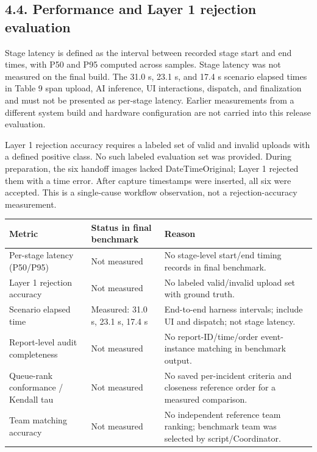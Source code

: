 \documentclass[pdflatex,sn-mathphys-ay]{sn-jnl}
\begin{document}

\subsection*{4.4. Performance and Layer 1 rejection evaluation}

Stage latency is defined as the interval between recorded stage start and end times, with P50 and P95 computed across samples. Stage latency was not measured on the final build. The 31.0 s, 23.1 s, and 17.4 s scenario elapsed times in Table 9 span upload, AI inference, UI interactions, dispatch, and finalization and must not be presented as per-stage latency. Earlier measurements from a different system build and hardware configuration are not carried into this release evaluation.

Layer 1 rejection accuracy requires a labeled set of valid and invalid uploads with a defined positive class. No such labeled evaluation set was provided. During preparation, the six handoff images lacked DateTimeOriginal; Layer 1 rejected them with a time error. After capture timestamps were inserted, all six were accepted. This is a single-cause workflow observation, not a rejection-accuracy measurement.
\vspace{8pt}


\begin{center}
\small
\renewcommand{\arraystretch}{1.15}
\setlength{\tabcolsep}{3pt}
\begin{tabularx}{\textwidth}{|X|X|X|}\hline
Metric & Status in final benchmark & Reason \\ \hline
Per-stage latency (P50/P95) & Not measured & No stage-level start/end timing records in final benchmark. \\ \hline
Layer 1 rejection accuracy & Not measured & No labeled valid/invalid upload set with ground truth. \\ \hline
Scenario elapsed time & Measured: 31.0 s, 23.1 s, 17.4 s & End-to-end harness intervals; include UI and dispatch; not stage latency. \\ \hline
Report-level audit completeness & Not measured & No report-ID/time/order event-instance matching in benchmark output. \\ \hline
Queue-rank conformance / Kendall tau & Not measured & No saved per-incident criteria and closeness reference order for a measured comparison. \\ \hline
Team matching accuracy & Not measured & No independent reference team ranking; benchmark team was selected by script/Coordinator. \\ \hline
\end{tabularx}
\end{center}
\end{document}
